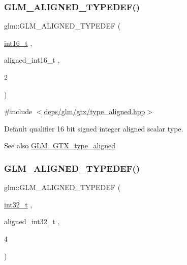 \subsubsection{\texorpdfstring{G\+L\+M\+\_\+\+A\+L\+I\+G\+N\+E\+D\+\_\+\+T\+Y\+P\+E\+D\+E\+F()}{GLM\_ALIGNED\_TYPEDEF()}\hspace{0.1cm}{\footnotesize\ttfamily [42/209]}}
{\footnotesize\ttfamily glm\+::\+G\+L\+M\+\_\+\+A\+L\+I\+G\+N\+E\+D\+\_\+\+T\+Y\+P\+E\+D\+EF (\begin{DoxyParamCaption}\item[{\hyperlink{group__gtc__type__precision_gaf89ee61e0d34aa4a462104b7ae7f2da6}{int16\+\_\+t}}]{,  }\item[{aligned\+\_\+int16\+\_\+t}]{,  }\item[{2}]{ }\end{DoxyParamCaption})}



{\ttfamily \#include $<$\hyperlink{gtx_2type__aligned_8hpp}{deps/glm/gtx/type\+\_\+aligned.\+hpp}$>$}

Default qualifier 16 bit signed integer aligned scalar type. \begin{DoxySeeAlso}{See also}
\hyperlink{group__gtx__type__aligned}{G\+L\+M\+\_\+\+G\+T\+X\+\_\+type\+\_\+aligned} 
\end{DoxySeeAlso}
\mbox{\label{group__gtx__type__aligned_gae553b33349d6da832cf0724f1e024094}} 
\subsubsection{\texorpdfstring{G\+L\+M\+\_\+\+A\+L\+I\+G\+N\+E\+D\+\_\+\+T\+Y\+P\+E\+D\+E\+F()}{GLM\_ALIGNED\_TYPEDEF()}\hspace{0.1cm}{\footnotesize\ttfamily [43/209]}}
{\footnotesize\ttfamily glm\+::\+G\+L\+M\+\_\+\+A\+L\+I\+G\+N\+E\+D\+\_\+\+T\+Y\+P\+E\+D\+EF (\begin{DoxyParamCaption}\item[{\hyperlink{group__gtc__type__precision_gab870c0eb6f525b0c8c4716762e0fc3a8}{int32\+\_\+t}}]{,  }\item[{aligned\+\_\+int32\+\_\+t}]{,  }\item[{4}]{ }\end{DoxyParamCaption})}



